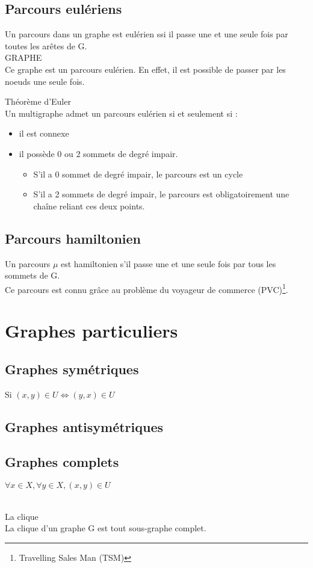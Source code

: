 \subsection{Parcours eulériens}
Un parcours dans un graphe est eulérien ssi il passe une et une seule fois par toutes les arêtes de G.\\
GRAPHE\\
Ce graphe est un parcours eulérien. En effet, il est possible de passer par les noeuds une seule fois.\\
\begin{theo}
Théorème d'Euler\\
Un multigraphe admet un parcours eulérien si et seulement si :
\begin{itemize}
 \item il est connexe
 \item il possède 0 ou 2 sommets de degré impair.
 \begin{itemize}
  \item S'il a 0 sommet de degré impair, le parcours est un cycle
  \item S'il a 2 sommets de degré impair, le parcours est obligatoirement une chaîne reliant ces deux points.
 \end{itemize}
\end{itemize}
\end{theo}
\subsection{Parcours hamiltonien}
Un parcours $\mu$ est hamiltonien s'il passe une et une seule fois par tous les sommets de G.\\
Ce parcours est connu grâce au problème du voyageur de commerce (PVC)\footnote{Travelling Sales Man (TSM)}.

\section{Graphes particuliers}
\subsection{Graphes symétriques}
Si $(x,y) \in U \Leftrightarrow (y,x) \in U$
\subsection{Graphes antisymétriques}

\subsection{Graphes complets}
$\forall x \in X, \forall y \in X, (x,y) \in U$\\~\\
\begin{theo}
La clique\\
 La clique d'un graphe G est tout sous-graphe complet.
\end{theo}

